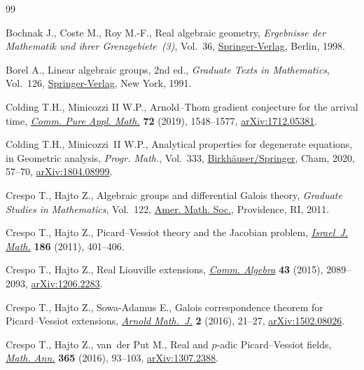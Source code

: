 \begin{thebibliography}{99}
\footnotesize\itemsep=0pt

Bochnak J., Coste M., Roy M.-F., Real algebraic geometry, \textit{Ergebnisse der
 Mathematik und ihrer Grenzgebiete~(3)}, Vol.~36, \href{https://doi.org/10.1007/978-3-662-03718-8}{Springer-Verlag}, Berlin,
 1998.

Borel A., Linear algebraic groups, 2nd ed., \textit{Graduate Texts in Mathematics}, Vol.~126, \href{https://doi.org/10.1007/978-1-4612-0941-6}{Springer-Verlag}, New York, 1991.

Colding T.H., Minicozzi II W.P., Arnold--{T}hom gradient conjecture for the
 arrival time, \href{https://doi.org/10.1002/cpa.21824}{\textit{Comm. Pure Appl. Math.}} \textbf{72} (2019), 1548--1577,
 \href{https://arxiv.org/abs/1712.05381}{arXiv:1712.05381}.

Colding T.H., Minicozzi~II W.P., Analytical properties for degenerate
 equations, in Geometric analysis, \textit{Progr. Math.}, Vol.~333,
 \href{https://doi.org/10.1007/978-3-030-34953-0_4}{Birkh\"auser/Springer}, Cham, 2020, 57--70, \href{https://arxiv.org/abs/1804.08999}{arXiv:1804.08999}.

Crespo T., Hajto Z., Algebraic groups and differential {G}alois theory,
 \textit{Graduate Studies in Mathematics}, Vol.~122, \href{https://doi.org/10.1090/gsm/122}{Amer. Math. Soc.},
 Providence, RI, 2011.

Crespo T., Hajto Z., Picard--{V}essiot theory and the {J}acobian problem,
 \href{https://doi.org/10.1007/s11856-011-0145-y}{\textit{Israel~J. Math.}} \textbf{186} (2011), 401--406.

Crespo T., Hajto Z., Real {L}iouville extensions, \href{https://doi.org/10.1080/00927872.2014.888561}{\textit{Comm. Algebra}}
 \textbf{43} (2015), 2089--2093, \href{https://arxiv.org/abs/1206.2283}{arXiv:1206.2283}.

Crespo T., Hajto Z., Sowa-Adamus E., Galois correspondence theorem for
 {P}icard--{V}essiot extensions, \href{https://doi.org/10.1007/s40598-015-0029-z}{\textit{Arnold Math.~J.}} \textbf{2} (2016),
 21--27, \href{https://arxiv.org/abs/1502.08026}{arXiv:1502.08026}.

Crespo T., Hajto Z., van~der Put M., Real and {$p$}-adic {P}icard--{V}essiot
 fields, \href{https://doi.org/10.1007/s00208-015-1272-2}{\textit{Math. Ann.}} \textbf{365} (2016), 93--103, \href{https://arxiv.org/abs/1307.2388}{arXiv:1307.2388}.


\end{thebibliography}
